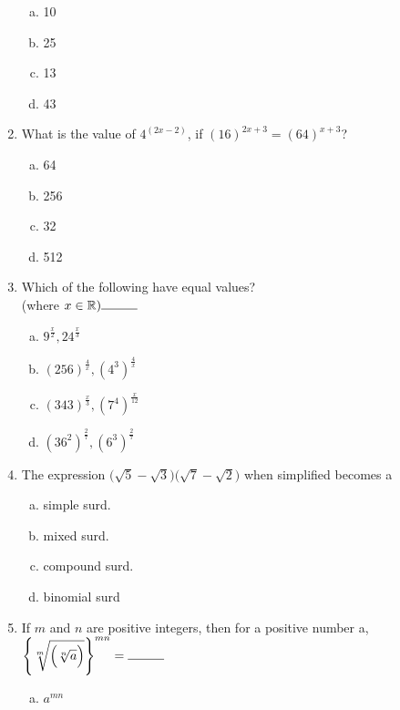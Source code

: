 \begin{multicols}{2}
\begin{enumerate}
\begin{multicols}{2}
\begin{enumerate}[(a)]
\item 10
\item 25
\item 13
\item 43
\end{enumerate}
\end{multicols}
\item What is the value of $4^{(2x-2)}$, if $(16)^{2x+3} = (64)^{x+3}$?
\begin{multicols}{2}
\begin{enumerate}[(a)]
\item 64
\item 256
\item 32
\item 512
\end{enumerate}
\end{multicols}
\item Which of the following have equal values?\\
(where $x \in \mathbb{R}) \rule{1cm}{0.15mm}$
\begin{multicols}{2}
\begin{enumerate}[(a)]
\item $9^{\frac{x}{2}}, 24^{\frac{x}{3}}$
\item $(256)^{\frac{4}{x}}, (4^3)^{\frac{4}{x}}$
\item $(343)^{\frac{x}{3}}, (7^4)^{\frac{x}{12}}$
\item $(36^2)^{\frac{2}{7}}, (6^3)^{\frac{2}{7}}$
\end{enumerate}
\end{multicols}
\item The expression $\Bigg(\sqrt{5}-\sqrt{3}\Bigg)\Bigg(\sqrt{7}-\sqrt{2}\Bigg)$ when simplified becomes a
\begin{multicols}{2}
\begin{enumerate}[(a)]
\item simple surd.
\item mixed surd.
\item compound surd.
\item binomial surd
\end{enumerate}
\end{multicols}
\item If $m$ and $n$ are positive integers, then for a positive number a,$ \Bigg\{\sqrt[m]{\Big(\sqrt[n]{a}\Big)}\Bigg\}^{mn} = \rule{1cm}{0.15mm}$
\begin{multicols}{2}
\begin{enumerate}[(a)]
\item $a^{mn}$

\end{enumerate}
\end{multicols}
\end{enumerate}
\end{multicols}
